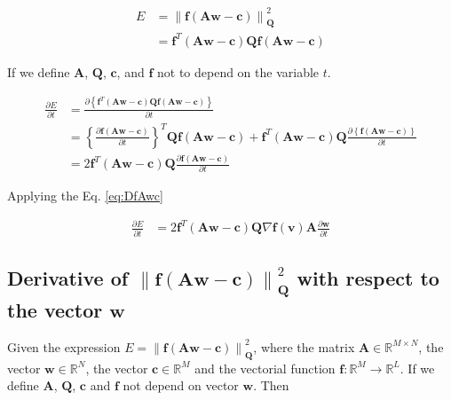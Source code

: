 \begin{align}
E&=\left\|\mathbf{f}\left(\mathbf{A}\mathbf{w}-\mathbf{c}\right)\right\|_{\mathbf{Q}}^2\\
~&=\mathbf{f}^{T}\left(\mathbf{A}\mathbf{w}-\mathbf{c}\right)\mathbf{Q}\mathbf{f}\left(\mathbf{A}\mathbf{w}-\mathbf{c}\right)
\end{align}

If we define $\mathbf{A}$, $\mathbf{Q}$, $\mathbf{c}$, and $\mathbf{f}$ not to depend on the variable $t$.

\begin{align}
\frac{\partial E}{\partial t}
&=\frac{\partial\left\{ \mathbf{f}^{T}\left(\mathbf{A}\mathbf{w}-\mathbf{c}\right)\mathbf{Q}\mathbf{f}\left(\mathbf{A}\mathbf{w}-\mathbf{c}\right)\right\}}{\partial t} \\
~
&=
\left\{\frac{\partial \mathbf{f}\left(\mathbf{A}\mathbf{w}-\mathbf{c}\right)}{\partial t} \right\}^{T}
\mathbf{Q}\mathbf{f}\left(\mathbf{A}\mathbf{w}-\mathbf{c}\right)
+
\mathbf{f}^{T}\left(\mathbf{A}\mathbf{w}-\mathbf{c}\right)\mathbf{Q}
\frac{\partial\left\{ \mathbf{f}\left(\mathbf{A}\mathbf{w}-\mathbf{c}\right)\right\}}{\partial t} \\
~
&=
2
\mathbf{f}^{T}\left(\mathbf{A}\mathbf{w}-\mathbf{c}\right)\mathbf{Q}
\frac{\partial \mathbf{f}\left(\mathbf{A}\mathbf{w}-\mathbf{c}\right)}{\partial t} 
\end{align}

Applying the Eq. \ref{eq:DfAwc}

\begin{align}
\label{eq:dEdt}
\frac{\partial E}{\partial t}
&=
2
\mathbf{f}^{T}\left(\mathbf{A}\mathbf{w}-\mathbf{c}\right)\mathbf{Q}
\nabla \mathbf{f}(\mathbf{v})
\mathbf{A}\frac{\partial \mathbf{w}}{\partial t}
\end{align}

\subsection{Derivative of $\left\|\mathbf{f}\left(\mathbf{A}\mathbf{w}-\mathbf{c}\right)\right\|_{\mathbf{Q}}^2$
with respect to the vector $\mathbf{w}$}

Given the expression $E=\left\|\mathbf{f}\left(\mathbf{A}\mathbf{w}-\mathbf{c}\right)\right\|_{\mathbf{Q}}^2$,
where
the matrix $\mathbf{A} \in \mathbb{R}^{M\times N}$,
the vector $\mathbf{w} \in \mathbb{R}^{N}$,
the vector $\mathbf{c} \in \mathbb{R}^{M}$ and 
the vectorial function $\mathbf{f}:\mathbb{R}^{M} \to \mathbb{R}^{L}$.
If we define $\mathbf{A}$, $\mathbf{Q}$, $\mathbf{c}$ and $\mathbf{f}$ not depend on vector $\mathbf{w}$. 
Then 

